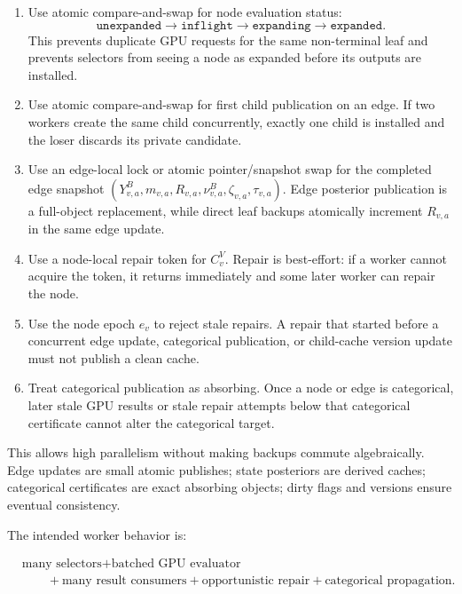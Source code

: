 \documentclass[11pt]{article}
\begin{document}
\begin{enumerate}[leftmargin=2em]
  \item Use atomic compare-and-swap for node evaluation status:
  \[
  \texttt{unexpanded}\rightarrow\texttt{inflight}\rightarrow\texttt{expanding}\rightarrow\texttt{expanded}.
  \]
  This prevents duplicate GPU requests for the same non-terminal leaf and prevents
  selectors from seeing a node as expanded before its outputs are installed.

  \item Use atomic compare-and-swap for first child publication on an edge. If
  two workers create the same child concurrently, exactly one child is installed
  and the loser discards its private candidate.

  \item Use an edge-local lock or atomic pointer/snapshot swap for the completed
  edge snapshot \((Y^B_{v,a},m_{v,a},R_{v,a},\nu^B_{v,a},\zeta_{v,a},\tau_{v,a})\).
  Edge posterior publication is a full-object replacement, while direct leaf
  backups atomically increment \(R_{v,a}\) in the same edge update.

  \item Use a node-local repair token for \(C^V_v\). Repair is best-effort: if a
  worker cannot acquire the token, it returns immediately and some later worker
  can repair the node.

  \item Use the node epoch \(e_v\) to reject stale repairs. A repair that started
  before a concurrent edge update, categorical publication, or child-cache
  version update must not publish a clean cache.

  \item Treat categorical publication as absorbing. Once a node or edge is
  categorical, later stale GPU results or stale repair attempts below that
  categorical certificate cannot alter the categorical target.
\end{enumerate}

This allows high parallelism without making backups commute algebraically. Edge
updates are small atomic publishes; state posteriors are derived caches;
categorical certificates are exact absorbing objects; dirty flags and versions
ensure eventual consistency.

The intended worker behavior is:

\[
\begin{aligned}
&\text{many selectors}
+\text{batched GPU evaluator}\\
&\qquad
+\text{many result consumers}
+\text{opportunistic repair}
+\text{categorical propagation}.
\end{aligned}
\]
\end{document}
